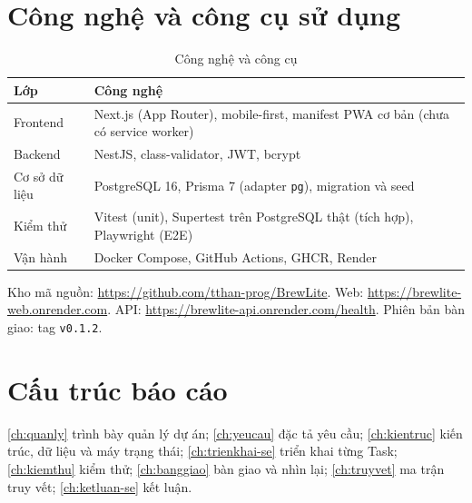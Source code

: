 \section{Công nghệ và công cụ sử dụng}\label{sec:se-congnghe}
\begin{table}[htbp]\centering
\caption{Công nghệ và công cụ}\label{tab:congnghe}
\begin{tabular}{@{}p{3.2cm}p{9.6cm}@{}}\toprule
\textbf{Lớp} & \textbf{Công nghệ} \\ \midrule
Frontend & Next.js (App Router), mobile-first, manifest PWA cơ bản (chưa có service worker) \\
Backend & NestJS, class-validator, JWT, bcrypt \\
Cơ sở dữ liệu & PostgreSQL 16, Prisma 7 (adapter \texttt{pg}), migration và seed \\
Kiểm thử & Vitest (unit), Supertest trên PostgreSQL thật (tích hợp), Playwright (E2E) \\
Vận hành & Docker Compose, GitHub Actions, GHCR, Render \\ \bottomrule
\end{tabular}
\end{table}
Kho mã nguồn: \url{https://github.com/tthan-prog/BrewLite}. Web: \url{https://brewlite-web.onrender.com}. API: \url{https://brewlite-api.onrender.com/health}. Phiên bản bàn giao: tag \texttt{v0.1.2}.

\section{Cấu trúc báo cáo}\label{sec:se-cautruc}
\cref{ch:quanly} trình bày quản lý dự án; \cref{ch:yeucau} đặc tả yêu cầu; \cref{ch:kientruc} kiến trúc, dữ liệu và máy trạng thái; \cref{ch:trienkhai-se} triển khai từng Task; \cref{ch:kiemthu} kiểm thử; \cref{ch:banggiao} bàn giao và nhìn lại; \cref{ch:truyvet} ma trận truy vết; \cref{ch:ketluan-se} kết luận.
